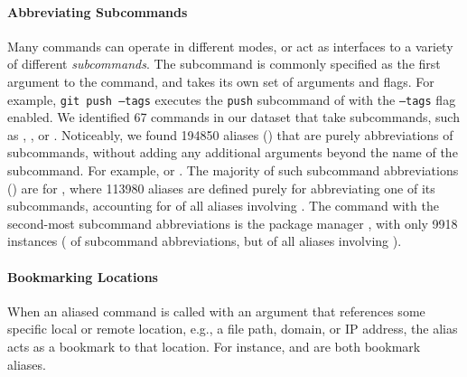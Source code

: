 
\paragraph{\bf Abbreviating Subcommands}

Many commands can operate in different modes, or act as interfaces to a variety of different \emph{subcommands}.
The subcommand is commonly specified as the first argument to the command, and takes its own set of arguments and flags.
For example, \texttt{git push --tags} executes the \texttt{push} subcommand of  with the \texttt{--tags} flag enabled.
We identified 67 commands in our dataset that take subcommands, such as , , or .
Noticeably, we found \num{194850} aliases () that are purely abbreviations of subcommands, without adding any additional arguments beyond the name of the subcommand.
For example,  or .
The majority of such subcommand abbreviations () are for , where \num{113980} aliases are defined purely for abbreviating one of its subcommands, accounting for  of all aliases involving .
The command with the second-most subcommand abbreviations is the package manager , with only \num{9918} instances ( of subcommand abbreviations, but  of all aliases involving ).

\paragraph{\bf Bookmarking Locations}

When an aliased command is called with an argument that references some specific local or remote location, e.g., a file path, domain, or IP address, the alias acts as a bookmark to that location.
For instance,  and  are both bookmark aliases.


